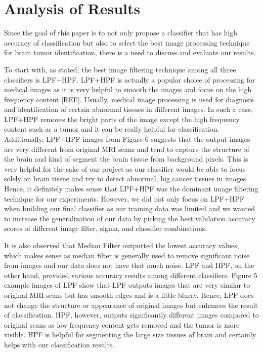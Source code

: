 \documentclass[conference]{IEEEtran}
\begin{document}
\section{Analysis of Results}\label{analysis}
Since the goal of this paper is to not only propose a classifier that has high accuracy of classification but also to select the best image processing technique for brain tumor identification, there is a need to discuss and evaluate our results. 

To start with, as stated, the best image filtering technique among all three classifiers is LPF+HPF. LPF+HPF is actually a popular choice of processing for medical images as it is very helpful to smooth the images and focus on the high frequency content [REF]. Usually, medical image processing is used for diagnosis and identification of certain abnormal tissues in different images. In such a case, LPF+HPF removes the bright parts of the image except the high frequency content such as a tumor and it can be really helpful for classification. Additionally, LPF+HPF images from Figure 6 suggests that the output images are very different from original MRI scans and tend to capture the structure of the brain and kind of segment the brain tissue from background pixels. This is very helpful for the sake of our project as our classifier would be able to focus solely on brain tissue and try to detect abnormal, big cancer tissues in images. Hence, it definitely makes sense that LPF+HPF was the dominant image filtering technique for our experiments. However, we did not only focus on LPF+HPF when building our final classifier as our training data was limited and we wanted to increase the generalization of our data by picking the best validation accuracy scores of different image filter, sigma, and classifier combinations. 

It is also observed that Median Filter outputted the lowest accuracy values, which makes sense as median filter is generally used to remove significant noise from images and our data does not have that much noise. LPF and HPF, on the other hand, provided various accuracy results among different classifiers. Figure 5 example images of LPF show that LPF outputs images that are very similar to original MRI scans but has smooth edges and is a little blurry. Hence, LPF does not change the structure or appearance of original images but enhances the result of classification. HPF, however, outputs significantly different images compared to original scans as low frequency content gets removed and the tumor is more visible. HPF is helpful for segmenting the large size tissues of brain and certainly helps with our classification results. 
\end{document}
